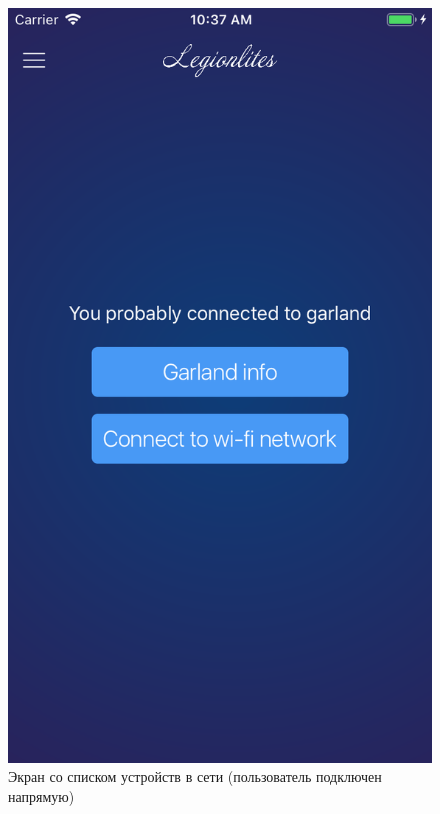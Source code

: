~
\begin{figure}[H]
\centering
	\includegraphics[scale=0.2]{figures/userGuide/device.png}
	\caption{Экран со списком устройств в сети (пользователь подключен напрямую)}
	\label{fig:develop:userGuide:device}
\end{figure}
~
